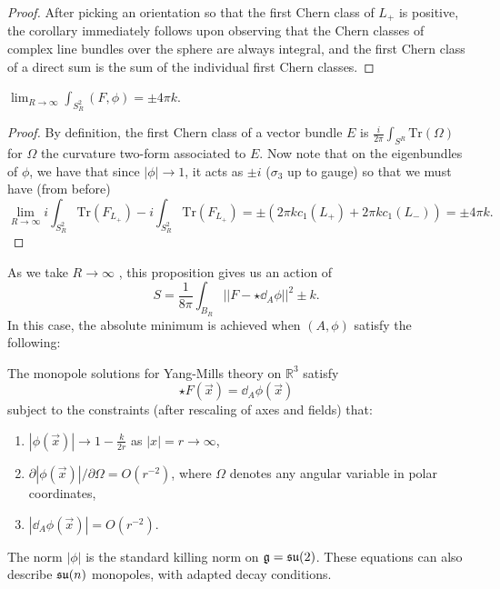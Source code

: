 	\begin{proof}
		After picking an orientation so that the first Chern class of $L_+$ is positive, the corollary immediately follows upon observing that the Chern classes of complex line bundles over the sphere are always integral, and the first Chern class of a direct sum is the sum of the individual first Chern classes. 
	\end{proof}
	\begin{prop}
		$\lim_{R\to \infty}\int_{S_R^2} (F, \phi) = \pm 4\pi k$.
	\end{prop}
	\begin{proof}
		By definition, the first Chern class of a vector bundle $E$ is $\frac{i}{2\pi} \int_{S^R} \text{Tr}(\Omega)$ for $\Omega$ the curvature two-form associated to $E$. Now note that on the eigenbundles of $\phi$, we have that since $|\phi| \to 1$, it acts as $\pm i$ ($\sigma_3$ up to gauge) so that we must have (from before)
		\begin{equation}
			\lim_{R \to \infty } i \int_{S_R^2} \text{Tr}(F_{L_+}) - i \int_{S_R^2} \text{Tr}(F_{L_+}) = \pm  (2\pi k c_1(L_+) + 2 \pi k c_1(L_-))  = \pm 4 \pi k.
		\end{equation}
	\end{proof}
	As we take $R \to \infty$ , this proposition gives us an action of
	\begin{equation}
		S = \frac{1}{8\pi} \int_{B_R}  ||F - \star \dd_A \phi||^2 \pm k.
	\end{equation}
	In this case, the absolute minimum is achieved when $(A, \phi)$ satisfy the following:
	\begin{prop}\label{prop:bogomolny}
		The monopole solutions for Yang-Mills theory on $\mathbb R^3$ satisfy
		\begin{equation}
			\star F(\vec x) = \dd_A \phi(\vec x)
		\end{equation}
		subject to the constraints (after rescaling of axes and fields) that:
		\begin{enumerate}
			\item $|\phi(\vec x)| \to 1 - \frac{k}{2r} $ as $|x|=r \to \infty$,
			\item $\partial |\phi(\vec x)|/\partial \Omega = O(r^{-2})$, where $\Omega$ denotes any angular variable in polar coordinates,
			\item $|\dd_A \phi(\vec x)| = O(r^{-2})$.
		\end{enumerate}
		The norm $|\phi|$ is the standard killing norm on $\frak g = \frak{su}(2)$. These equations can also describe $\frak{su}(n)$ monopoles, with adapted decay conditions.
	\end{prop}
	

